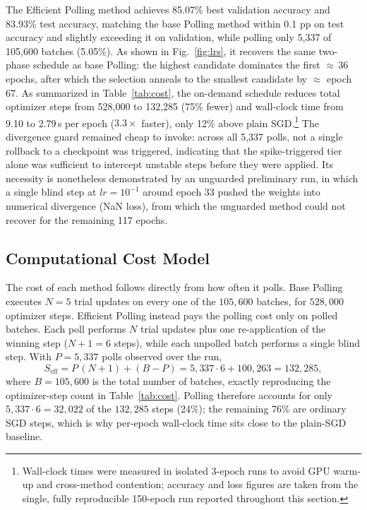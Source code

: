 \documentclass[conference]{IEEEtran}
\begin{document}
The Efficient Polling method achieves 85.07\% best validation accuracy and 83.93\% test accuracy, matching the base Polling method within 0.1 pp on test accuracy and slightly exceeding it on validation, while polling only 5{,}337 of 105{,}600 batches (5.05\%). As shown in Fig.~\ref{fig:lrs}, it recovers the same two-phase schedule as base Polling: the highest candidate dominates the first ${\approx}\,36$ epochs, after which the selection anneals to the smallest candidate by ${\approx}$ epoch 67. As summarized in Table~\ref{tab:cost}, the on-demand schedule reduces total optimizer steps from 528{,}000 to 132{,}285 (75\% fewer) and wall-clock time from 9.10 to 2.79\,s per epoch ($3.3\times$ faster), only 12\% above plain SGD.\footnote{Wall-clock times were measured in isolated 3-epoch runs to avoid GPU warm-up and cross-method contention; accuracy and loss figures are taken from the single, fully reproducible 150-epoch run reported throughout this section.} The divergence guard remained cheap to invoke: across all 5{,}337 polls, not a single rollback to a checkpoint was triggered, indicating that the spike-triggered tier alone was sufficient to intercept unstable steps before they were applied. Its necessity is nonetheless demonstrated by an unguarded preliminary run, in which a single blind step at $lr = 10^{-1}$ around epoch 33 pushed the weights into numerical divergence (NaN loss), from which the unguarded method could not recover for the remaining 117 epochs.

\subsection{Computational Cost Model}
\label{sec:cost}

The cost of each method follows directly from how often it polls. Base Polling executes $N = 5$ trial updates on every one of the $105{,}600$ batches, for $528{,}000$ optimizer steps. Efficient Polling instead pays the polling cost only on polled batches. Each poll performs $N$ trial updates plus one re-application of the winning step ($N + 1 = 6$ steps), while each unpolled batch performs a single blind step. With $P = 5{,}337$ polls observed over the run,
\begin{equation}
S_{\mathrm{eff}} = P\,(N+1) + (B - P) = 5{,}337 \cdot 6 + 100{,}263 = 132{,}285,
\label{eq:cost}
\end{equation}
where $B = 105{,}600$ is the total number of batches, exactly reproducing the optimizer-step count in Table~\ref{tab:cost}. Polling therefore accounts for only $5{,}337 \cdot 6 = 32{,}022$ of the $132{,}285$ steps (24\%); the remaining 76\% are ordinary SGD steps, which is why per-epoch wall-clock time sits close to the plain-SGD baseline.
\end{document}
